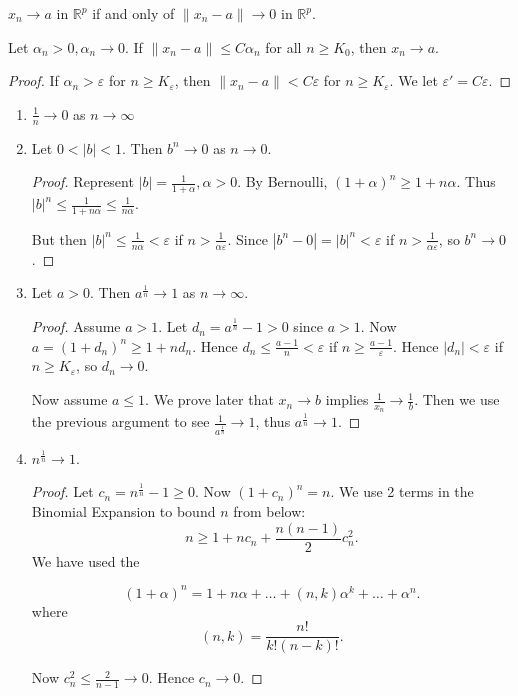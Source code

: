 
\begin{lemma}
	$x_n \to a$ in $\mathbb{R}^p$ if and only of $\|x_n - a\| \to 0$ in $\mathbb{R}^p$.
\end{lemma}
\begin{lemma}
	Let $\alpha_n>0, \alpha_n \to 0$. If $\|x_n - a\|\le C \alpha_n$ for all $n \ge K_0$, then $x_n \to  a$.
\end{lemma}
\begin{proof}
	If $\alpha_n > \varepsilon$ for $n \ge K_\varepsilon$, then $\|x_n - a\|< C\varepsilon$ for $n \ge K_\varepsilon$. We let $\varepsilon' =  C \varepsilon $.
\end{proof}

\begin{example}
	\begin{enumerate}
		\item $\frac{1}{n} \to  0$ as $n \to \infty $
		\item Let $0<|b|<1$. Then $b^n \to 0$ as $n\to 0$.
			\begin{proof}
				Represent $|b| = \frac{1}{1+\alpha}, \alpha>0$. By Bernoulli, $(1+\alpha)^n \ge 1+n \alpha$. Thus $|b|^n \le \frac{1}{1+n \alpha}\le \frac{1}{n \alpha }$. 

				But then $|b|^n \le \frac{1}{n \alpha}< \varepsilon$ if $n>\frac{1}{\alpha \varepsilon}$. Since $|b^n - 0| = |b|^n < \varepsilon$ if $n > \frac{1}{\alpha\varepsilon}$, so $b^n \to 0$.
			\end{proof}
		\item Let $a>0$. Then $a^{\frac{1}{n}}\to 1$ as $n\to \infty $.
			\begin{proof}
				Assume  $a>1$. Let $d_n = a^{\frac{1}{n}}-1> 0$ since $a>1$. 
				Now $a = (1+d_n)^n\ge 1+ n d_n$.
				Hence $d_n \le \frac{a-1 }{n}<\varepsilon$ if $n\ge \frac{a-1}{\varepsilon}$.
				Hence $|d_n|<\varepsilon$ if $n \ge K_\varepsilon$, so $d_n \to  0$.

			Now assume $a \le 1$. We prove later that $x_n \to b$ implies $\frac{1}{x_n}\to \frac{1}{b}$. Then we use the previous argument to see $\frac{1}{a^{\frac{1}{n}}}\to 1$, thus $a^{\frac{1}{n}}\to 1$.
			\end{proof}
		\item $n^{\frac{1}{n}}\to 1$. 
			\begin{proof}
				Let $c_n = n^{\frac{1}{n}}-1\ge 0$.
				Now $(1+c_n)^n = n$. We use 2 terms in the Binomial Expansion to bound $n$ from below:
				\[
					n \ge 1+n c_n + \frac{n(n-1)}{2}c_n^2
				.\] 
				We have used the 
				\begin{theorem}
					\[
						(1+\alpha)^n = 1 + n \alpha + \ldots + (n,k) \alpha^k + \ldots + \alpha^n
					.\] 
					where \[
						(n,k) = \frac{n!}{k! (n-k)!}
					.\] 
				\end{theorem}
				Now $c_n^2 \le \frac{2}{n-1} \to 0$. Hence $c_n \to 0$.
			\end{proof}
			
			
			
	\end{enumerate}
\end{example}

